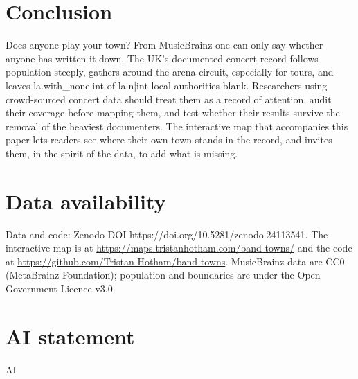 \documentclass[11pt,a4paper]{article}
\begin{document}
\section{Conclusion}\label{sec:concl}
Does anyone play your town? From MusicBrainz one can only say whether anyone has written it down. The UK's documented concert record follows population steeply, gathers around the arena circuit, especially for tours, and leaves {{la.with_none|int}} of {{la.n|int}} local authorities blank. Researchers using crowd-sourced concert data should treat them as a record of attention, audit their coverage before mapping them, and test whether their results survive the removal of the heaviest documenters. The interactive map that accompanies this paper lets readers see where their own town stands in the record, and invites them, in the spirit of the data, to add what is missing.

\section*{Data availability}
Data and code: Zenodo DOI https://doi.org/10.5281/zenodo.24113541. The interactive map is at \url{https://maps.tristanhotham.com/band-towns/} and the code at \url{https://github.com/Tristan-Hotham/band-towns}. MusicBrainz data are CC0 (MetaBrainz Foundation); population and boundaries are under the Open Government Licence v3.0.

\section*{AI statement}
{{AI}}
\end{document}
